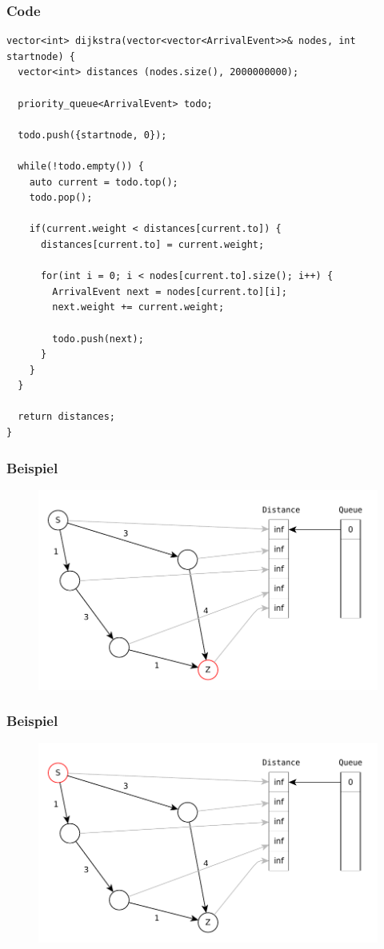 \begin{frame}[fragile]
\frametitle{Code}
\begin{lstlisting}[basicstyle=\tiny]
vector<int> dijkstra(vector<vector<ArrivalEvent>>& nodes, int startnode) {
  vector<int> distances (nodes.size(), 2000000000);

  priority_queue<ArrivalEvent> todo;

  todo.push({startnode, 0});

  while(!todo.empty()) {
    auto current = todo.top();
    todo.pop();

    if(current.weight < distances[current.to]) {
      distances[current.to] = current.weight;

      for(int i = 0; i < nodes[current.to].size(); i++) {
        ArrivalEvent next = nodes[current.to][i];
        next.weight += current.weight;

        todo.push(next);
      }
    }
  }

  return distances;
}
\end{lstlisting}

\end{frame}


\begin{frame}
\frametitle{Beispiel}
\begin{figure}
\includegraphics[scale=.8]{dijkstra_graphs/dijkstra_0.pdf}
\end{figure}
\end{frame}

\begin{frame}
\frametitle{Beispiel}
\begin{figure}
\includegraphics[scale=.8]{dijkstra_graphs/dijkstra_1.pdf}
\end{figure}
\end{frame}

